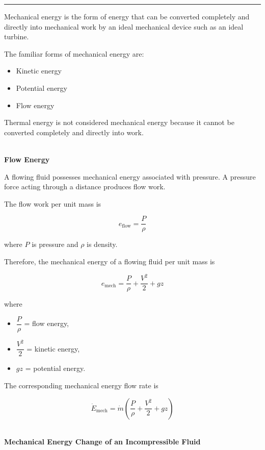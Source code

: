 \documentclass[12pt]{article}
\newcommand{\mysubsection}[2]{%
    \vspace{5px}
    \noindent{\headingfont\large #1\space #2\par}
    \vspace{4pt}
    \hrule
    \vspace{15pt}
}
\begin{document}
\mysubsection{}{Mechanical Energy}

Mechanical energy is the form of energy that can be converted completely and directly into mechanical work by an ideal mechanical device such as an ideal turbine.

The familiar forms of mechanical energy are:

\begin{itemize}
    \item Kinetic energy
    \item Potential energy
    \item Flow energy
\end{itemize}

Thermal energy is not considered mechanical energy because it cannot be converted completely and directly into work.

\textbf{\\ Flow Energy}

A flowing fluid possesses mechanical energy associated with pressure. A pressure force acting through a distance produces flow work.

The flow work per unit mass is

\begin{equation*}
e_{\text{flow}} = \frac{P}{\rho}
\end{equation*}

where $P$ is pressure and $\rho$ is density.

Therefore, the mechanical energy of a flowing fluid per unit mass is

\begin{equation*}
e_{\text{mech}}
=
\frac{P}{\rho}
+
\frac{V^2}{2}
+
gz
\end{equation*}

where

\begin{itemize}
    \item $\dfrac{P}{\rho}$ = flow energy,
    \item $\dfrac{V^2}{2}$ = kinetic energy,
    \item $gz$ = potential energy.
\end{itemize}

The corresponding mechanical energy flow rate is

\begin{equation*}
\dot{E}_{\text{mech}}
=
\dot{m}
\left(
\frac{P}{\rho}
+
\frac{V^2}{2}
+
gz
\right)
\end{equation*}

\textbf{\\ Mechanical Energy Change of an Incompressible Fluid}
\end{document}
